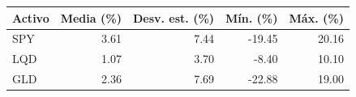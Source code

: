 \begin{tabular}{lrrrr}
\toprule
Activo & Media (\%) & Desv. est. (\%) & Mín. (\%) & Máx. (\%) \\
\midrule
SPY & 3.61 & 7.44 & -19.45 & 20.16 \\
LQD & 1.07 & 3.70 & -8.40 & 10.10 \\
GLD & 2.36 & 7.69 & -22.88 & 19.00 \\
\bottomrule
\end{tabular}
